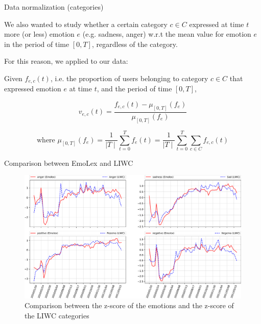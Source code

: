 \documentclass[8pt]{beamer}  %
\begin{document}
\begin{frame}{Data normalization (categories)}
	
	We also wanted to study whether a certain category \(c \in C\) expressed at time \(t\) more (or less) emotion \(e\) (e.g. sadness, anger) w.r.t the mean value for emotion \(e\) in the period of time \([0, T]\), regardless of the category.

    For this reason, we applied  to our data:
    	
    \begin{definition}
    \label{def:categories-normalization}
    	Given \(f_{e, c}(t)\), i.e. the proportion of users belonging to category \(c \in C\) that expressed emotion \(e\) at time \(t\), and the period of time \([0,T]\),
    	
    	\[v_{e, c}(t) = \frac{f_{e, c}(t) - \mu_{[0,T]}(f_e)}{\mu_{[0,T]}(f_e)}\]
    	
    	\[\text{where } \mu_{[0,T]}(f_e) = \frac{1}{\mid T \mid} \sum_{t =0}^{T} f_e(t) = \frac{1}{\mid T \mid} \sum_{t =0}^{T} \sum_{c \in C} f_{e, c}(t)\] 
    \end{definition}
	
\end{frame}

\begin{frame}{Comparison between EmoLex and LIWC}

    \begin{figure}[H]
	    \centering
    	\includegraphics[scale=.25]{assets/img/en_emotions_and_liwc_categories_comparison.svg.pdf}
    	\caption{Comparison between the z-score of the emotions and the z-score of the LIWC categories}
    	\label{fig:en-emotions-liwc-comparison}
    \end{figure}
    
\end{frame}
\end{document}
